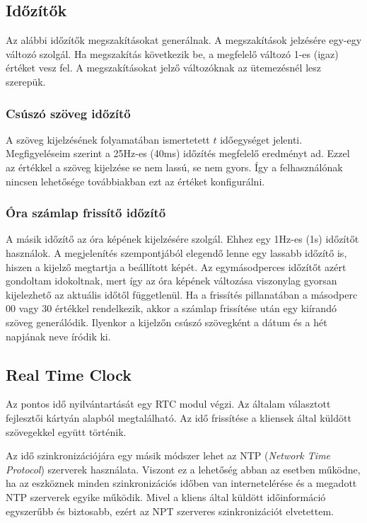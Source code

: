 \documentclass[a4paper, 12pt]{article}
\begin{document}
\subsection{Időzítők}

Az alábbi időzítők megszakításokat generálnak. A megszakítások jelzésére egy-egy változó szolgál. Ha megszakítás következik be, a megfelelő változó 1-es (igaz) értéket vesz fel. A megszakításokat jelző változóknak az ütemezésnél lesz szerepük.

\subsubsection{Csúszó szöveg időzítő}
A szöveg kijelzésének folyamatában ismertetett $t$ időegységet jelenti. Megfigyeléseim szerint a 25Hz-es (40ms) időzítés megfelelő eredményt ad. Ezzel az értékkel a szöveg kijelzése se nem lassú, se nem gyors. Így a felhasználónak nincsen lehetősége továbbiakban ezt az értéket konfigurálni.

\subsubsection{Óra számlap frissítő időzítő}
A másik időzítő az óra képének kijelzésére szolgál. Ehhez egy 1Hz-es (1s) időzítőt használok. A megjelenítés szempontjából elegendő lenne egy lassabb időzítő is, hiszen a kijelző megtartja a beállított képét. Az egymásodperces időzítőt azért gondoltam idokoltnak, mert így az óra képének változása viszonylag gyorsan kijelezhető az aktuális időtől függetlenül.
Ha a frissítés pillanatában a másodperc 00 vagy 30 értékkel rendelkezik, akkor a számlap frissítése után egy kiírandó szöveg generálódik. Ilyenkor a kijelzőn csúszó szövegként a dátum és a hét napjának neve íródik ki.

\subsection{Real Time Clock}
Az pontos idő nyilvántartását egy RTC modul végzi. Az általam választott fejlesztői kártyán alapból megtalálható.
Az idő frissítése a kliensek által küldött szövegekkel együtt történik.

Az idő szinkronizációjára egy másik módszer lehet az NTP (\textit{Network Time Protocol}) szerverek használata. Viszont ez a lehetőség abban az esetben működne, ha az eszköznek minden szinkronizációs időben van internetelérése és a megadott NTP szerverek egyike működik.
Mivel a kliens által küldött időinformáció egyszerűbb és biztosabb, ezért az NPT szerveres szinkronizációt elvetettem.
\end{document}
